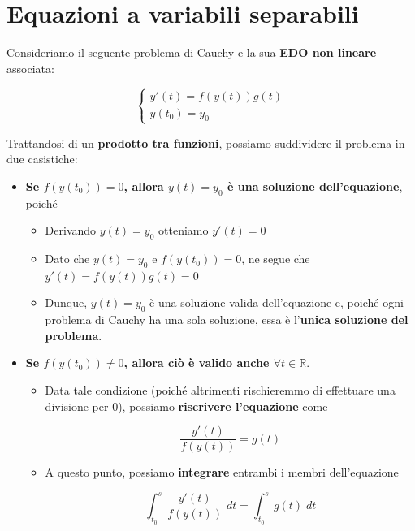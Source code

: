 \documentclass[a4paper, 12pt]{report}
\begin{document}
    \section{Equazioni a variabili separabili}
    
    Consideriamo il seguente problema di Cauchy e la sua \textbf{EDO non lineare} associata:
    
    $$
    \left \{ \begin{array}{l}
        y'(t) = f(y(t))g(t) \\
        y(t_0) = y_0
    \end{array}\right .
    $$
    
    Trattandosi di un \textbf{prodotto tra funzioni}, possiamo suddividere il problema in due casistiche:
    
    \begin{itemize}
        \item \textbf{Se $f(y(t_0)) = 0$, allora $y(t) = y_0$ è una soluzione dell'equazione}, poiché
        
        \begin{itemize}
            \item Derivando $y(t) = y_0$ otteniamo $y'(t) = 0$
            \item Dato che $y(t) = y_0$ e $f(y(t_0)) = 0$, ne segue che $y'(t) = f(y(t))g(t) = 0$
            \item Dunque, $y(t) = y_0$ è una soluzione valida dell'equazione e, poiché ogni problema di Cauchy ha una sola soluzione, essa è l'\textbf{unica soluzione del problema}.
        \end{itemize}
        
        \quad
        
        \item \textbf{Se $f(y(t_0)) \neq 0$, allora ciò è valido anche $\forall t \in \mathbb{R}$}.
        
        \begin{itemize}
            \item Data tale condizione (poiché altrimenti rischieremmo di effettuare una divisione per 0), possiamo \textbf{riscrivere l'equazione} come
        
            \[ \frac{y'(t)}{f(y(t))} = g(t)\]
        
            \item A questo punto, possiamo \textbf{integrare} entrambi i membri dell'equazione
            
            \[ \int_{t_0}^{s} \frac{y'(t)}{f(y(t))} \; dt = \int_{t_0}^{s} g(t) \; dt\]
            

\end{itemize}
\end{itemize}
\end{document}
